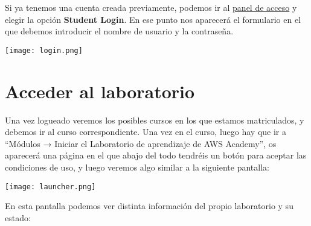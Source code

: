 Si ya tenemos una cuenta creada previamente, podemos ir al \href{https://www.awsacademy.com/vforcesite/LMS_Login}{panel de acceso} y elegir la opción \textbf{Student Login}. En ese punto nos aparecerá el formulario en el que debemos introducir el nombre de usuario y la contraseña.

\begin{center}
	\texttt{[image: login.png]}
\end{center}

\chapter{Acceder al laboratorio}

Una vez logueado veremos los posibles cursos en los que estamos matriculados, y debemos ir al curso correspondiente. Una vez en el curso, luego hay que ir a “Módulos → Iniciar el Laboratorio de aprendizaje de AWS Academy”, os aparecerá una página en el que abajo del todo tendréis un botón para aceptar las condiciones de uso, y luego veremos algo similar a la siguiente pantalla:

\begin{center}
	\texttt{[image: launcher.png]}
\end{center}

En esta pantalla podemos ver distinta información del propio laboratorio y su estado:

